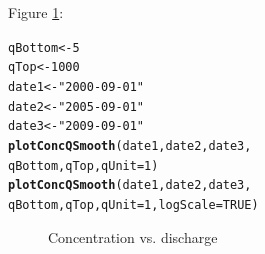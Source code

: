 \documentclass[a4paper,11pt]{article}\usepackage[]{graphicx}\usepackage[]{color}
\makeatletter
\newcommand{\hlnum}[1]{\textcolor[rgb]{0.686,0.059,0.569}{#1}}%
\newcommand{\hlstr}[1]{\textcolor[rgb]{0.192,0.494,0.8}{#1}}%
\newcommand{\hlstd}[1]{\textcolor[rgb]{0.345,0.345,0.345}{#1}}%
\newcommand{\hlkwb}[1]{\textcolor[rgb]{0.69,0.353,0.396}{#1}}%
\newcommand{\hlkwc}[1]{\textcolor[rgb]{0.333,0.667,0.333}{#1}}%
\newcommand{\hlkwd}[1]{\textcolor[rgb]{0.737,0.353,0.396}{\textbf{#1}}}%
\newenvironment{kframe}{%
 \def\at@end@of@kframe{}%
 \ifinner\ifhmode%
  \def\at@end@of@kframe{\end{minipage}}%
  \begin{minipage}{\columnwidth}%
 \fi\fi%
 \def\FrameCommand##1{\hskip\@totalleftmargin \hskip-\fboxsep
 \colorbox{shadecolor}{##1}\hskip-\fboxsep
     \hskip-\linewidth \hskip-\@totalleftmargin \hskip\columnwidth}%
 \MakeFramed {\advance\hsize-\width
   \@totalleftmargin\z@ \linewidth\hsize
   \@setminipage}}%
 {\par\unskip\endMakeFramed%
 \at@end@of@kframe}
\newenvironment{knitrout}{}{} %
\makeatother
\begin{document}
Figure \ref{fig:plotConcQSmooth}:
\begin{knitrout}
\color{fgcolor}\begin{kframe}
\begin{alltt}
\hlstd{qBottom}\hlkwb{<-}\hlnum{5}
\hlstd{qTop}\hlkwb{<-}\hlnum{1000}
\hlstd{date1} \hlkwb{<-} \hlstr{"2000-09-01"}
\hlstd{date2} \hlkwb{<-} \hlstr{"2005-09-01"}
\hlstd{date3} \hlkwb{<-} \hlstr{"2009-09-01"}
\hlkwd{plotConcQSmooth}\hlstd{(date1, date2, date3,}
                \hlstd{qBottom, qTop,} \hlkwc{qUnit}\hlstd{=}\hlnum{1}\hlstd{)}
\hlkwd{plotConcQSmooth}\hlstd{(date1, date2, date3,}
                \hlstd{qBottom, qTop,} \hlkwc{qUnit}\hlstd{=}\hlnum{1}\hlstd{,}\hlkwc{logScale}\hlstd{=}\hlnum{TRUE}\hlstd{)}
\end{alltt}
\end{kframe}\begin{figure}[]
\caption[Concentration vs]{Concentration vs. discharge\label{fig:plotConcQSmooth}}
\end{figure}


\end{knitrout}
\end{document}
